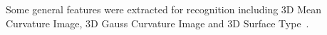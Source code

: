 
Some general features were extracted for recognition including 3D Mean Curvature Image, 3D Gauss Curvature Image and 3D Surface Type~\cite{Zhang:2008kc,Li:2009eq}.

